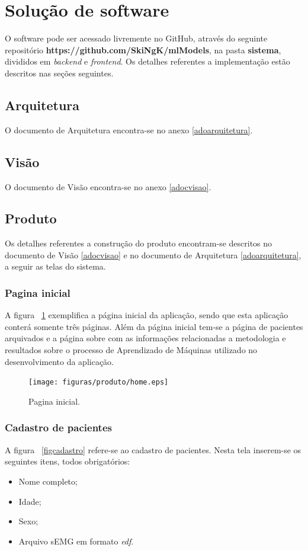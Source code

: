 \section{Solução de software}
O software pode ser acessado livremente no GitHub, através do seguinte repositório \textbf{https://github.com/SkiNgK/mlModels}, na pasta \textbf{sistema}, divididos em \textit{backend} e \textit{frontend}. Os detalhes referentes a implementação estão descritos nas seções seguintes.

\subsection{Arquitetura}
O documento de Arquitetura encontra-se no anexo \ref{adoarquitetura}.

\subsection{Visão}
O documento de Visão encontra-se no anexo \ref{adocvisao}.

\subsection{Produto}
Os detalhes referentes a construção do produto encontram-se descritos no documento de Visão \ref{adocvisao} e no documento de Arquitetura \ref{adoarquitetura}, a seguir as telas do sistema.


\subsubsection{Pagina inicial}
A figura ~\ref{fighome} exemplifica a página inicial da aplicação, sendo que esta aplicação  conterá somente três páginas. Além da página inicial tem-se a página de pacientes arquivados e a página sobre com as informações relacionadas a metodologia e resultados sobre o processo de Aprendizado de Máquinas utilizado no desenvolvimento da aplicação.

\begin{figure}[!htb]
    \centering
    \texttt{[image: figuras/produto/home.eps]}
    \caption{Pagina inicial.}
    \label{fighome}
\end{figure}

\subsubsection{Cadastro de pacientes}
A figura ~\ref{figcadastro} refere-se ao cadastro de pacientes. Nesta tela inserem-se os seguintes itens, todos obrigatórios:
\begin{itemize}
    \item Nome completo;
    \item Idade;
    \item Sexo;
    \item Arquivo sEMG em formato \textit{edf}.
\end{itemize}


